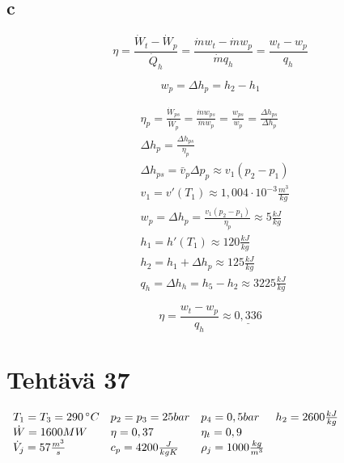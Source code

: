\documentclass[12pt,a4paper,finnish]{article}
\begin{document}
\subsection{c}

\begin{equation}
 \eta = \frac{\dot{W}_t - \dot{W}_p}{\dot{Q}_h} = \frac{\dot{m}w_t - \dot{m}w_p}{\dot{m}q_h} = \frac{w_t - w_p}{q_h}
\end{equation}

\begin{equation}
 w_p = \Delta h_p = h_2 - h_1
\end{equation}

\begin{align}
 &\eta_p = \frac{\dot{W}_{ps}}{\dot{W}_p} = \frac{\dot{m}w_{ps}}{\dot{m}w_p} = \frac{w_{ps}}{w_p} = \frac{\Delta h_{ps}}{\Delta h_p}\\
 &\Delta h_p = \frac{\Delta h_{ps}}{\eta_p}\\
 &\Delta h_{ps} = \bar{v}_p\Delta p_p \approx v_1(p_2 - p_1)\\
 &v_1 = v'(T_1) \approx 1,004\cdot10^{-3}\frac{m^3}{kg}\\
 &w_p = \Delta h_p = \frac{v_1(p_2 - p_1)}{\eta_p} \approx 5 \frac{kJ}{kg}\\
 &h_1 = h'(T_1) \approx 120 \frac{kJ}{kg}\\
 &h_2 = h_1 + \Delta h_p \approx 125 \frac{kJ}{kg}\\
 &q_h = \Delta h_h = h_5 - h_2 \approx 3225 \frac{kJ}{kg}
\end{align}

\begin{equation}
 \eta = \frac{w_t - w_p}{q_h} \approx \underline{0,336}
\end{equation}

\section{Tehtävä 37}

\begin{math}
 \begin{array}{l l l l}
  T_1 = T_3 = 290 \,^{\circ}C & p_2 = p_3 = 25 bar & p_4 = 0,5 bar & h_2 = 2600 \frac{kJ}{kg}\\
  \dot{W} = 1600 MW & \eta = 0,37 & \eta_t = 0,9 &\\
  \dot{V}_j = 57 \frac{m^3}{s} & c_p = 4200 \frac{J}{kgK} & \rho_j = 1000 \frac{kg}{m^3} &
 \end{array}
\end{math}
\end{document}
